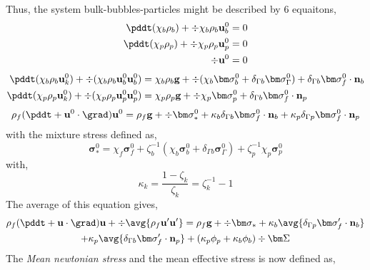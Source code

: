 Thus, the system bulk-bubbles-particles might be described by 6 equaitons, 
\begin{align}
    \pddt (\chi_b \rho_b)
    + \div 
        \chi_b \rho_b \textbf{u}_b^0
    &= 
    0\\
    \pddt (\chi_p \rho_p)
    + \div 
        \chi_p \rho_p \textbf{u}_p^0
    &= 
    0\\
    \div \textbf{u}^0
    &= 
    0
\end{align}
\begin{align}
    \pddt (\chi_b \rho_b \textbf{u}^0_k)
    + \div (
        \chi_b \rho_b \textbf{u}^0_b \textbf{u}_b^0
        )
    &= 
    \chi_b \rho_b \textbf{g}
    + \div (\chi_b \bm\sigma_b^0  + \delta_{\Gamma b} \bm\sigma_\Gamma^0 )
    + \delta_{\Gamma b}  \bm\sigma_f^0 \cdot \textbf{n}_b\\
    \pddt (\chi_p \rho_p \textbf{u}^0_k)
    + \div (
        \chi_p \rho_p \textbf{u}^0_p \textbf{u}_p^0
        )
    &= 
    \chi_p \rho_p \textbf{g}
    + \div \chi_p \bm\sigma_p^0  
    + \delta_{\Gamma b}  \bm\sigma_f^0 \cdot \textbf{n}_p
\end{align}
\begin{equation}
    \rho_f (\pddt + \textbf{u}^0 \cdot \grad)\textbf{u}^0
    = 
    \rho_f \textbf{g}
    + \div \bm\sigma^0_*
    +\kappa_b  \delta_{\Gamma b}  \bm\sigma_f^0 \cdot \textbf{n}_b 
    +\kappa_p  \delta_{\Gamma p}  \bm\sigma_f^0 \cdot \textbf{n}_p 
\end{equation}
with the mixture stress defined as, 
\begin{equation}
    \bm\sigma^0_*
    =
    \chi_f \bm\sigma_f^0  
    +\zeta_b^{-1} (\chi_b \bm\sigma_b^0 + \delta_{\Gamma b} \bm\sigma_\Gamma^0)  
    +\zeta_p^{-1} \chi_p \bm\sigma_p^0 
\end{equation}
with, 
\begin{equation}
    \kappa_k 
    = \frac{1  - \zeta_k}{\zeta_k}
    = \zeta^{-1}_k - 1
\end{equation}
The average of this equation gives, 
\begin{multline}
    \rho_f (\pddt + \textbf{u} \cdot \grad)\textbf{u}
    + \div \avg{\rho_f \textbf{u}' \textbf{u}'}
    = 
    \rho_f \textbf{g}
    + \div \bm\sigma_*
    +\kappa_b  \avg{\delta_{\Gamma p} \bm\sigma_f' \cdot \textbf{n}_b} \\
    +\kappa_p  \avg{\delta_{\Gamma b}  \bm\sigma_f' \cdot \textbf{n}_p} 
    + (\kappa_p \phi_p + \kappa_b \phi_b)\div\bm\Sigma
\end{multline}
The \textit{Mean newtonian stress} and the mean effective stress is now defined as, 
